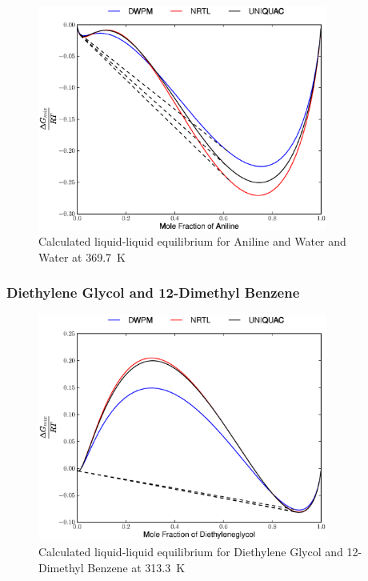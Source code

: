 \begin{figure}[hp]
\centering
\includegraphics[width = 0.85\textwidth]{Results_Parts/BinaryParams/aniline-water/AllModelsGibbsPlots/T_369.7.eps}
\caption{Calculated liquid-liquid equilibrium for Aniline and Water and Water at 369.7~$\mathrm{K}$}
\end{figure}

\clearpage


\subsubsection*{Diethylene Glycol and 12-Dimethyl Benzene}

\begin{figure}[hp]
\centering
\includegraphics[width = 0.85\textwidth]{Results_Parts/BinaryParams/diethyleneglycol-12-dimethylbenzene/AllModelsGibbsPlots/T_313.3.eps}
\caption{Calculated liquid-liquid equilibrium for Diethylene Glycol and 12-Dimethyl Benzene at 313.3~$\mathrm{K}$} 
\end{figure}

